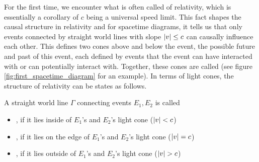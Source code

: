 For the first time, we encounter what is often called  of relativity, which is essentially a corollary of $c$ being a universal speed limit. This fact shapes the causal structure in relativity and for spacetime diagrams, it tells us that only events connected by straight world lines with slope $\abs{v} \leq c$ can causally influence each other. This defines two cones above and below the event, the possible future and past of this event, each defined by events that the event can have interacted with or can potentially interact with. Together, these cones are called  (see figure \ref{fig:first_spacetime_diagram} for an example). In terms of light cones, the structure of relativity can be states as follows.
\begin{defi}
	A straight world line $\Gamma$ connecting events $E_1, E_2$ is called
	\begin{itemize}
		\item {}, if it lies inside of $E_1$'s and $E_2$'s light cone ($\abs{v} < c$)
		
		
		\item {}, if it lies on the edge of $E_1$'s and $E_2$'s light cone ($\abs{v} = c$)
		
		
		\item {}, if it lies outside of $E_1$'s and $E_2$'s light cone ($\abs{v} > c$)
	\end{itemize}
\end{defi}




